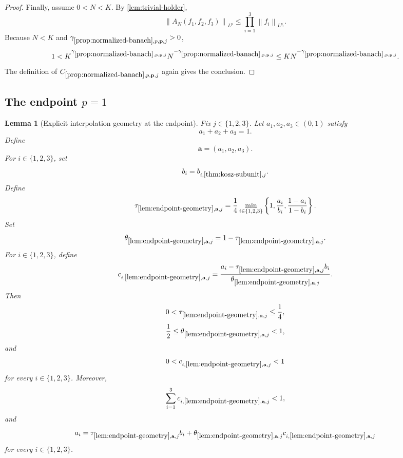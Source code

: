 \documentclass[11pt]{article}
\newtheorem{lemma}[theorem]{Lemma}
\newcommand{\norm}[2]{\left\lVert #1\right\rVert_{#2}}
\newcommand{\Cst}[2]{C_{\ref{#1},#2}}
\newcommand{\Gam}[2]{\gamma_{\ref{#1},#2}}
\newcommand{\set}[1]{\left\{#1\right\}}
\newcommand{\indices}{\{1,2,3\}}
\begin{document}
\begin{proof}
Finally, assume \(0<N<K\).  By \cref{lem:trivial-holder},
\[
\norm{A_N(f_1,f_2,f_3)}{L^p}
\leq
\prod_{i=1}^{3}\norm{f_i}{L^{p_i}}.
\]
Because \(N<K\) and \(\Gam{prop:normalized-banach}{p,\mathbf p,j}>0\),
\[
1<K^{\Gam{prop:normalized-banach}{p,\mathbf p,j}}
N^{-\Gam{prop:normalized-banach}{p,\mathbf p,j}}
\leq
K N^{-\Gam{prop:normalized-banach}{p,\mathbf p,j}}.
\]
The definition of \(\Cst{prop:normalized-banach}{p,\mathbf p,j}\) again gives the conclusion.
\end{proof}

\subsection{The endpoint \(p=1\)}

\begin{lemma}[Explicit interpolation geometry at the endpoint]\label{lem:endpoint-geometry}
Fix \(j\in\indices\).  Let \(a_1,a_2,a_3\in(0,1)\) satisfy
\[
a_1+a_2+a_3=1.
\]
Define
\[
\mathbf a=(a_1,a_2,a_3).
\]
For \(i\in\indices\), set
\[
b_i=b_{i,\ref{thm:kosz-subunit},j}.
\]
Define
\[
\tau_{\ref{lem:endpoint-geometry},\mathbf a,j}
=
\frac14
\min_{i\in\indices}
\set{
1,
\frac{a_i}{b_i},
\frac{1-a_i}{1-b_i}
}.
\]
Set
\[
\theta_{\ref{lem:endpoint-geometry},\mathbf a,j}
=1-\tau_{\ref{lem:endpoint-geometry},\mathbf a,j}.
\]
For \(i\in\indices\), define
\[
c_{i,\ref{lem:endpoint-geometry},\mathbf a,j}
=
\frac{a_i-\tau_{\ref{lem:endpoint-geometry},\mathbf a,j}b_i}
{\theta_{\ref{lem:endpoint-geometry},\mathbf a,j}}.
\]
Then
\[
0<\tau_{\ref{lem:endpoint-geometry},\mathbf a,j}\leq\frac14,
\]
\[
\frac12\leq\theta_{\ref{lem:endpoint-geometry},\mathbf a,j}<1,
\]
and
\[
0<c_{i,\ref{lem:endpoint-geometry},\mathbf a,j}<1
\]
for every \(i\in\indices\).  Moreover,
\[
\sum_{i=1}^{3}c_{i,\ref{lem:endpoint-geometry},\mathbf a,j}<1,
\]
and
\[
a_i
=
\tau_{\ref{lem:endpoint-geometry},\mathbf a,j}b_i
+
\theta_{\ref{lem:endpoint-geometry},\mathbf a,j}
 c_{i,\ref{lem:endpoint-geometry},\mathbf a,j}
\]
for every \(i\in\indices\).
\end{lemma}
\end{document}
